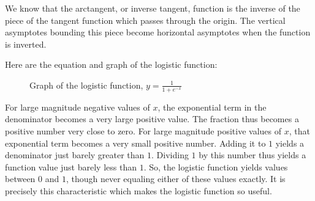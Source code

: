 We know that the arctangent, or inverse tangent, function is the inverse of the 
piece of the tangent function which passes through the origin. The vertical 
asymptotes bounding this piece become horizontal asymptotes when the function is 
inverted.

Here are the equation and graph of the logistic function:

\begin{figure}[htbp]
  \centering
  \caption{Graph of the logistic function, $ y = \frac{1}{1 + e^{-x}} $}
\end{figure}


For large magnitude negative values of $x$, the exponential term in the denominator 
becomes a very large positive value. The fraction thus becomes a positive number 
very close to zero. For large magnitude positive values of $x$, that exponential 
term becomes a very small positive number. Adding it to $1$ yields a denominator 
just barely greater than $1$. Dividing $1$ by this number thus yields a function 
value just barely less than $1$. So, the logistic function yields values between 
$0$ and $1$, though never equaling either of these values exactly. It is precisely 
this characteristic which makes the logistic function so useful.

